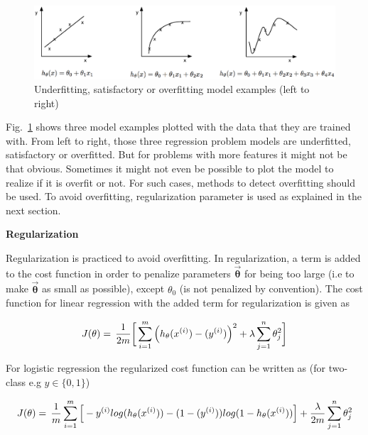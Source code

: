 \begin{figure}[H]
\begin{center}
\includegraphics[width=16cm]{figures/underOverFit}    %
\caption{Underfitting, satisfactory or overfitting model examples (left to right)} 
\label{fig:underOverFit}
\end{center}
\end{figure}

Fig.~\ref{fig:underOverFit} shows three model examples plotted with the data that they are trained with. From left to right, those three regression problem models are underfitted, satisfactory or overfitted. 
But for problems with more features it might not be that obvious. Sometimes it might not even be possible to plot the model to realize if it is overfit or not.
For such cases, methods to detect overfitting should be used. 
To avoid overfitting, regularization parameter is used as explained in the next section.

\textbf{Regularization}

Regularization is practiced to avoid overfitting.
In regularization, a term is added to the cost function in order to penalize parameters $\vec{\bm{\theta}}$ for being too large (i.e to make $\vec{\bm{\theta}}$ as small as possible), except ${\theta}_0$ (is not penalized by convention). The cost function for linear regression with the added term for regularization is given as

\begin{equation}{\label{eqn:costFuncRegularized}}
J(\theta)
=\,
\frac{1}{2m} \bigg[ \sum\limits_{i=1}^{m} \Big(h_\theta(x^{(i)}) - (y^{(i)})\Big)^2 +\lambda \sum\limits_{j=1}^{n} \theta_j^2 \bigg] 
\end{equation} 

For logistic regression the regularized cost function can be written as (for two-class e.g $y \in \{0,1\}$)

\begin{equation}{\label{eqn:costFuncLogisticRegression}}
J(\theta)
=\,
\frac{1}{m} \sum\limits_{i=1}^{m} \Big[-y^{(i)}log(h_\theta(x^{(i)})) - (1-(y^{(i)}))log(1-h_\theta(x^{(i)}))\Big] +\frac{\lambda}{2m} \sum\limits_{j=1}^{n} \theta_j^2
\end{equation} 

